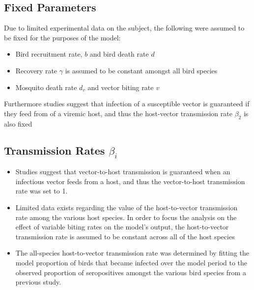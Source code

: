 \documentclass[portrait]{sciposter}
\begin{document}
\begin{multicols}{2}
\subsection*{Fixed Parameters}
Due to limited experimental data on the subject, the following were assumed to be fixed for the purposes of the model:
\begin{itemize}
\item Bird recruitment rate, $\textit{b}$ and bird death rate $\textit{d}$ 
\item Recovery rate $\gamma$ is assumed to be constant amongst all bird species
\item Mosquito death rate $d_v$ and vector biting rate \textit{v} 
\end{itemize}
Furthermore studies suggest that infection of a susceptible vector is guaranteed if they feed from of a viremic host, and thus the host-vector transmission rate $\beta_2$ is also fixed

\subsection*{Transmission Rates $\beta_i$}
\begin{itemize}
\item Studies suggest that vector-to-host transmission is guaranteed when an infectious vector feeds
from a host, and thus the vector-to-host transmission rate was set to 1. 
\item Limited data exists regarding the value of the host-to-vector transmission rate among the various host species. In
order to focus the analysis on the effect of variable biting rates on the model's output, the host-to-vector
transmission rate is assumed to be constant across all of the host species
\item The all-species host-to-vector transmission rate was determined by fitting the model proportion of birds that
became infected over the model period to the observed proportion of seropositives amongst the
various bird species from a previous study. 
\end{itemize}

\columnbreak
 

\end{multicols}
\end{document}
